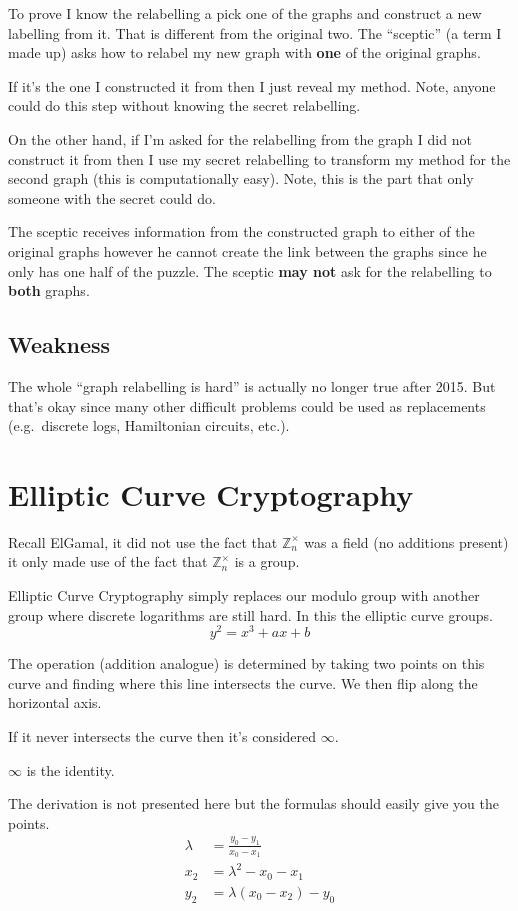 \documentclass{report}
\begin{document}
To prove I know the relabelling a pick one of the graphs and construct a new
labelling from it. That is different from the original two.
The ``sceptic'' (a term I made up) asks how to relabel my
new graph with \textbf{one} of the original graphs.

If it's the one I constructed it from then I just reveal my method. Note,
anyone could do this step without knowing the secret relabelling.

On the other hand, if I'm asked for the relabelling from the graph I did not
construct it from then I use my secret relabelling to transform my method
for the second graph (this is computationally easy). Note, this is the part
that only someone with the secret could do.

The sceptic receives information from the constructed graph to either
of the original graphs however he cannot create the link between the graphs
since he only has one half of the puzzle. The sceptic \textbf{may not}
ask for the
relabelling to \textbf{both} graphs.

\subsection{Weakness}
The whole ``graph relabelling is hard'' is actually no longer true after
2015. But that's okay since many other difficult problems could be used as
replacements (e.g.\ discrete logs, Hamiltonian circuits, etc.).

\section{Elliptic Curve Cryptography}
Recall ElGamal, it did not use the fact that $\mathbb{Z}_n^\times$ was a field
(no additions present) it only made use of the fact that $\mathbb{Z}_n^\times$
is a group.

Elliptic Curve Cryptography simply replaces our modulo group with another
group
where discrete logarithms are still hard. In this the elliptic curve groups.
\[
    y^2 = x^3 + ax + b
\]

The operation (addition analogue) is determined by taking two points on
this curve and finding where this line intersects the curve. We then flip
along the horizontal axis.

If it never intersects the curve then
it's considered $\infty$.

$\infty$ is the identity.

The derivation is not presented here but the formulas should easily give you
the points.
\begin{align*}
    \lambda &= \frac{y_0 - y_1}{x_0 - x_1} \\
    x_2 &= \lambda^2 - x_0 - x_1 \\
    y_2 &= \lambda(x_0 - x_2) - y_0 \\
\end{align*}
\end{document}

